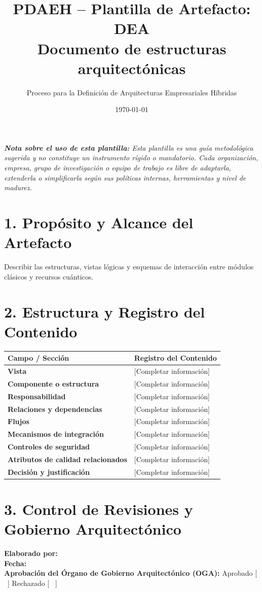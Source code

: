 \documentclass[11pt,a4paper]{article}
\title{\textbf{\color{brandgreen} PDAEH -- Plantilla de Artefacto: DEA} \\[0.3em] \large Documento de estructuras arquitectónicas}
\author{Proceso para la Definición de Arquitecturas Empresariales Híbridas}
\date{\today}
\begin{document}
\maketitle

\noindent \textit{\textbf{Nota sobre el uso de esta plantilla:} Esta plantilla es una guía metodológica sugerida y no constituye un instrumento rígido o mandatorio. Cada organización, empresa, grupo de investigación o equipo de trabajo es libre de adaptarla, extenderla o simplificarla según sus políticas internas, herramientas y nivel de madurez.}

\section*{1. Propósito y Alcance del Artefacto}
Describir las estructuras, vistas lógicas y esquemas de interacción entre módulos clásicos y recursos cuánticos.

\section*{2. Estructura y Registro del Contenido}
\begin{tabularx}{\textwidth}{|>{\bfseries}p{4.5cm}|X|}
    \hline
    \rowcolor[gray]{0.92} Campo / Sección & Registro del Contenido \\ \hline
    \textbf{Vista} & [Completar información] \\ \hline
    \textbf{Componente o estructura} & [Completar información] \\ \hline
    \textbf{Responsabilidad} & [Completar información] \\ \hline
    \textbf{Relaciones y dependencias} & [Completar información] \\ \hline
    \textbf{Flujos} & [Completar información] \\ \hline
    \textbf{Mecanismos de integración} & [Completar información] \\ \hline
    \textbf{Controles de seguridad} & [Completar información] \\ \hline
    \textbf{Atributos de calidad relacionados} & [Completar información] \\ \hline
    \textbf{Decisión y justificación} & [Completar información] \\ \hline
\end{tabularx}

\vspace{1.2cm}
\section*{3. Control de Revisiones y Gobierno Arquitectónico}
\noindent \textbf{Elaborado por:} \hrulefill \\[0.5em]
\textbf{Fecha:} \hrulefill \\[0.5em]
\textbf{Aprobación del Órgano de Gobierno Arquitectónico (OGA):} Aprobado [ \, ] \quad Rechazado [ \, ]
\end{document}
